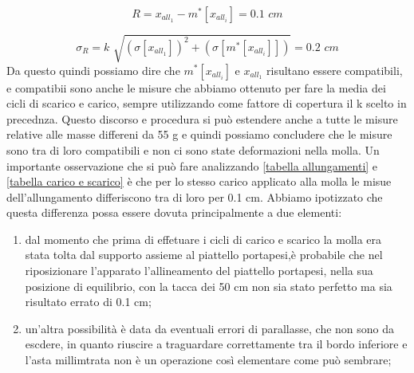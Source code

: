 \begin{equation*}
	R = x_{all_1} - m^*[x_{all_i}] = 0.1 \,\,cm
\end{equation*}

\begin{equation*}
	\sigma_{R} = k\,\, \sqrt{(\sigma[x_{all_1}])^2 + (\sigma[m^*[x_{all_i}]])} = 0.2 \,\,cm
\end{equation*}
Da questo quindi possiamo dire che $m^*[x_{all_i}]$ e $x_{all_1}$ risultano essere compatibili, e compatibii sono anche le misure che abbiamo ottenuto per fare la media dei cicli di scarico e carico, sempre utilizzando come fattore di copertura il k scelto in precednza.
Questo discorso e procedura si può estendere anche a tutte le misure relative alle masse differeni da 55 g e quindi possiamo concludere che le misure sono tra di loro compatibili e non ci sono state deformazioni nella molla.
Un importante osservazione che si può fare analizzando \ref{tabella allungamenti} e \ref{tabella carico e scarico} è che per lo stesso carico applicato alla molla le misue dell'allungamento differiscono tra di loro per 0.1 cm. Abbiamo ipotizzato che questa differenza possa essere dovuta principalmente a due elementi:

\begin{enumerate}
	\item{dal momento che prima di effetuare i cicli di carico e scarico la molla era stata tolta dal supporto assieme al piattello portapesi,è probabile che nel riposizionare l'apparato l'allineamento del piattello portapesi, nella sua posizione di equilibrio, con la tacca dei 50 cm non sia stato perfetto ma sia risultato errato di 0.1 cm;}
	\item{un'altra possibilità è data da eventuali errori di parallasse, che non sono da escdere, in quanto riuscire a traguardare correttamente tra il bordo inferiore e l'asta millimtrata non è un operazione così elementare come può sembrare;}
\end{enumerate}

